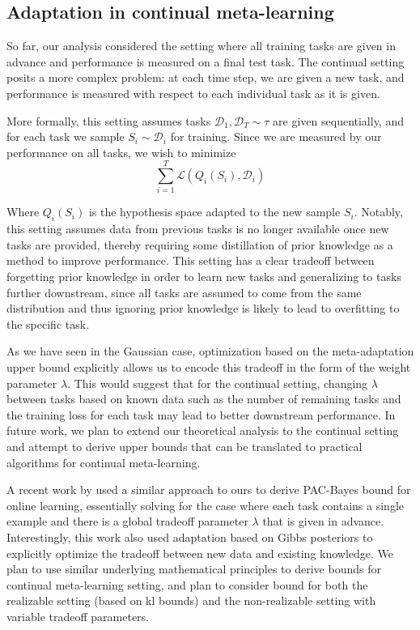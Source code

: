 \documentclass{article}
\theoremstyle{definition}
\begin{document}
\subsection{Adaptation in continual meta-learning}

So far, our analysis considered the setting where all training tasks are given in advance and performance is measured on a final test task. The continual setting posits a more complex problem: at each time step, we are given a new task, and performance is measured with respect to each individual task as it is given. 

More formally, this setting assumes tasks $\mathcal{D}_1,\mathcal{D}_T\sim \tau$ are given sequentially, and for each task we sample $S_i\sim \mathcal{D}_i$ for training. Since we are measured by our performance on all tasks, we wish to minimize 
$$\sum_{i=1}^{T}\mathcal{L}(Q_i(S_i), \mathcal{D}_i)$$

Where $Q_i(S_i)$ is the hypothesis space adapted to the new sample $S_i$. Notably, this setting assumes data from previous tasks is no longer available once new tasks are provided, thereby requiring some distillation of prior knowledge as a method to improve performance. This setting has a clear tradeoff between forgetting prior knowledge in order to learn new tasks and generalizing to tasks further downstream, since all tasks are assumed to come from the same distribution and thus ignoring prior knowledge is likely to lead to overfitting to the specific task.

As we have seen in the Gaussian case, optimization based on the meta-adaptation upper bound explicitly allows us to encode this tradeoff in the form of the weight parameter $\lambda$.
This would suggest that for the continual setting, changing $\lambda$ between tasks based on known data such as the number of remaining tasks and the training loss for each task may lead to better downstream performance. In future work, we plan to extend our theoretical analysis to the continual setting and attempt to derive upper bounds that can be translated to practical algorithms for continual meta-learning.

A recent work by \citet{Haddouche2022} used a similar approach to ours to derive PAC-Bayes bound for online learning, essentially solving for the case where each task contains a single example and there is a global tradeoff parameter $\lambda$ that is given in advance. Interestingly, this work also used adaptation based on Gibbs posteriors to explicitly optimize the tradeoff between new data and existing knowledge. We plan to use similar underlying mathematical principles to derive bounds for continual meta-learning setting, and plan to consider bound for both the realizable setting (based on kl bounds) and the non-realizable setting with variable tradeoff parameters.
\end{document}
